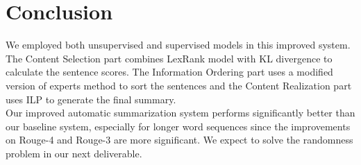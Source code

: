 \documentclass[11pt]{article}
\begin{document}
\section{Conclusion}

We employed both unsupervised and supervised models in this improved system. The Content Selection part combines LexRank model with KL divergence to calculate the sentence scores. The Information Ordering part uses a modified version of experts method to sort the sentences and the Content Realization part uses ILP to generate the final summary. \\
\indent
Our improved automatic summarization system performs significantly better than our baseline system, especially for longer word sequences since the improvements on Rouge-4 and Rouge-3 are more significant. We expect to solve the randomness problem in our next deliverable.
\end{document}
